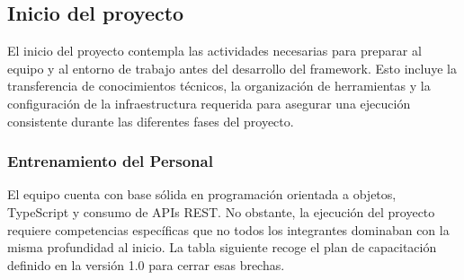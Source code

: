 \subsection{Inicio del proyecto}

El inicio del proyecto contempla las actividades necesarias para preparar al equipo y al entorno de trabajo antes del desarrollo del framework. Esto incluye la transferencia de conocimientos técnicos, la organización de herramientas y la configuración de la infraestructura requerida para asegurar una ejecución consistente durante las diferentes fases del proyecto.

\subsubsection{Entrenamiento del Personal}

El equipo cuenta con base sólida en programación orientada a objetos, TypeScript y consumo de APIs REST. No obstante, la ejecución del proyecto requiere competencias específicas que no todos los integrantes dominaban con la misma profundidad al inicio. La tabla siguiente recoge el plan de capacitación definido en la versión 1.0 para cerrar esas brechas.

